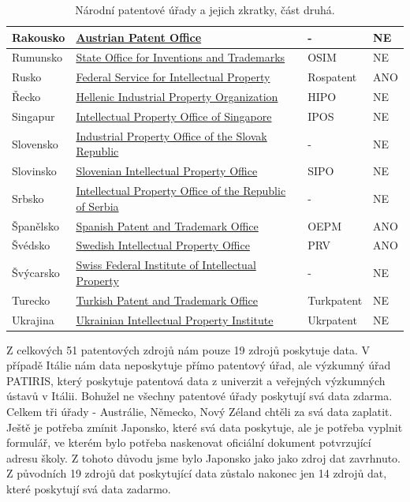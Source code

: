 \begin{table}[H]
\begin{tabular}{|>{\centering\arraybackslash}p{2.2cm}|>{\centering\arraybackslash}p{7cm}|>{\centering\arraybackslash}p{2cm}|>{\centering\arraybackslash}p{1cm}|}
	\hline
	Rakousko & \href{http://www.patentamt.at/}{Austrian Patent Office}  & -     & NE    \\ 
	\hline
	Rumunsko & \href{http://www.osim.ro/}{State Office for Inventions and Trademarks}  & OSIM      & NE   \\ 
	\hline
	Rusko & \href{https://rospatent.gov.ru/}{Federal Service for Intellectual Property}  & Rospatent   & ANO      \\ 
	\hline
	Řecko & \href{http://www.obi.gr/el/}{Hellenic Industrial Property Organization}  & HIPO   & NE      \\ 
	\hline
	Singapur & \href{http://www.ipos.gov.sg/}{Intellectual Property Office of Singapore}  & IPOS    & NE     \\ 
	\hline
	Slovensko & \href{https://www.indprop.gov.sk/}{Industrial Property Office of the Slovak Republic}  & -     & NE    \\ 
	\hline
	Slovinsko & \href{http://www.uil-sipo.si/}{Slovenian Intellectual Property Office}  & SIPO   & NE      \\ 
	\hline
	Srbsko & \href{http://www.zis.gov.rs/}{Intellectual Property Office of the Republic of Serbia}  & -   & NE      \\ 
	\hline
	Španělsko & \href{http://www.oepm.es/}{Spanish Patent and Trademark Office}  & OEPM   & ANO      \\ 
	\hline
	Švédsko & \href{http://www.prv.se/}{Swedish Intellectual Property Office}  & PRV   & ANO      \\ 
	\hline
	Švýcarsko & \href{https://www.ige.ch/}{Swiss Federal Institute of Intellectual Property}  & -     & NE    \\ 
	\hline
	Turecko & \href{http://www.turkpatent.gov.tr/}{Turkish Patent and Trademark Office}  & Turkpatent   & NE      \\ 
	\hline
	Ukrajina & \href{https://ukrpatent.org/en}{Ukrainian Intellectual Property Institute}  & Ukrpatent    & NE     \\ 
	\hline
	\end{tabular}
	\caption{Národní patentové úřady a jejich zkratky, část druhá.}
	\label{tab:table_offices2}
	\end{table}
\newpage

\noindent Z celkových 51 patentových zdrojů nám pouze 19 zdrojů poskytuje data. V případě Itálie nám data neposkytuje přímo patentový úřad, ale výzkumný úřad PATIRIS, který poskytuje patentová data z univerzit a veřejných výzkumných ústavů v Itálii. 
\newline
\indent Bohužel ne všechny patentové úřady poskytují svá data zdarma. Celkem tři úřady - Austrálie, Německo, Nový Zéland chtěli za svá data zaplatit. 
\newline
\indent Ještě je potřeba zmínit Japonsko, které svá data poskytuje, ale je potřeba vyplnit formulář, ve kterém bylo potřeba naskenovat oficiální dokument potvrzující adresu školy. Z tohoto důvodu jsme bylo Japonsko jako jako zdroj dat zavrhnuto. Z původních 19 zdrojů dat poskytující data zůstalo nakonec jen 14 zdrojů dat, které poskytují svá data zadarmo.

